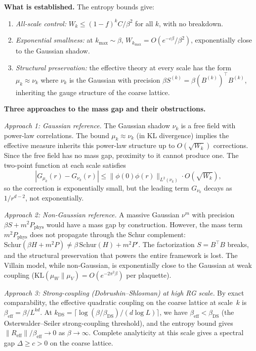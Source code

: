 \documentclass[11pt]{article}
\theoremstyle{definition}
\newcommand{\KL}{\mathrm{KL}}
\begin{document}
\textbf{What is established.}
The entropy bounds give:
\begin{enumerate}
\item \emph{All-scale control:} $W_k \leq (1-f)^k C/\beta^2$ for 
  all $k$, with no breakdown.
\item \emph{Exponential smallness:} at $k_{\max} \sim \beta$, 
  $W_{k_{\max}} = O(e^{-c\beta}/\beta^2)$, exponentially close to the 
  Gaussian shadow.
\item \emph{Structural preservation:} the effective theory at every 
  scale has the form $\mu_k \approx \nu_k$ where $\nu_k$ is the 
  Gaussian with precision $\beta S^{(k)} = \beta (B^{(k)})^\top B^{(k)}$, 
  inheriting the gauge structure of the coarse lattice.
\end{enumerate}

\textbf{Three approaches to the mass gap and their obstructions.}

\emph{Approach 1: Gaussian reference.}
The Gaussian shadow $\nu_k$ is a free field with power-law 
correlations.  The bound $\mu_k \approx \nu_k$ (in KL divergence) 
implies the effective measure inherits this power-law structure 
up to $O(\sqrt{W_k})$ corrections.  Since the free field has 
no mass gap, proximity to it cannot produce one.  The two-point 
function at each scale satisfies
\[
  |G_{\mu_k}(r) - G_{\nu_k}(r)| \leq 
  \|\phi(0)\phi(r)\|_{L^2(\nu_k)} \cdot O(\sqrt{W_k}),
\]
so the correction is exponentially small, but the leading term 
$G_{\nu_k}$ decays as $1/r^{d-2}$, not exponentially.

\emph{Approach 2: Non-Gaussian reference.}
A massive Gaussian $\nu^m$ with precision $\beta S + m^2 P_{\mathrm{phys}}$ 
would have a mass gap by construction.  However, the mass term 
$m^2 P_{\mathrm{phys}}$ does not propagate through the Schur complement: 
$\mathrm{Schur}(\beta H + m^2 P) \neq \beta\,\mathrm{Schur}(H) + m^2 P'$.
The factorization $S = B^\top B$ breaks, and the structural preservation 
that powers the entire framework is lost.  The Villain model, while 
non-Gaussian, is exponentially close to the Gaussian at weak coupling 
($\KL(\mu_W \| \mu_V) = O(e^{-2\pi^2\beta})$ per plaquette).

\emph{Approach 3: Strong-coupling (Dobrushin--Shlosman) at high RG scale.}
By exact comparability, the effective quadratic coupling on the 
coarse lattice at scale~$k$ is $\beta_{\mathrm{eff}} = \beta/L^{kd}$.  
At $k_{\mathrm{DS}} = \lceil \log(\beta/\beta_{\mathrm{DS}})/(d\log L) \rceil$, 
we have $\beta_{\mathrm{eff}} < \beta_{\mathrm{DS}}$ (the 
Osterwalder--Seiler strong-coupling threshold), and the entropy 
bound gives $\|R_{\mathrm{eff}}\|/\beta_{\mathrm{eff}} \to 0$ 
as $\beta \to \infty$.  Complete analyticity at this scale gives 
a spectral gap $\Delta \geq c > 0$ on the coarse lattice.
\end{document}
